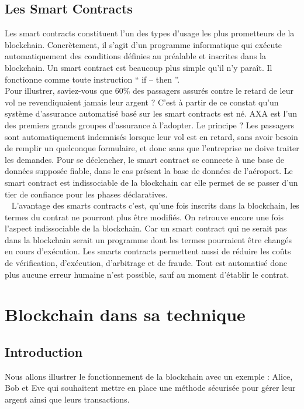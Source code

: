 \documentclass[12pt, a4paper, oneside]{book}
\begin{document}
    \section{Les Smart Contracts}
    Les smart contracts constituent l’un des types d’usage les plus prometteurs de la blockchain. Concrètement, il s’agit d’un programme informatique qui exécute automatiquement des conditions définies au préalable et inscrites dans la blockchain. Un smart contract est beaucoup plus simple qu’il n’y paraît. Il fonctionne comme toute instruction \hyphenquote{french}{ if – then }. 
    \\
    \indent
    Pour illustrer, saviez-vous que 60\% des passagers assurés contre le retard de leur vol ne revendiquaient jamais leur argent ? C’est à partir de ce constat qu’un système d’assurance automatisé basé sur les smart contracts est né. AXA est l’un des premiers grands groupes d’assurance à l’adopter. Le principe ? Les passagers sont automatiquement indemnisés lorsque leur vol est en retard, sans avoir besoin de remplir un quelconque formulaire, et donc sans que l’entreprise ne doive traiter les demandes. Pour se déclencher, le smart contract se connecte à une base de données supposée fiable, dans le cas présent la base de données de l’aéroport.
    Le smart contract est indissociable de la blockchain car elle permet de se passer d’un tier de confiance pour les phases déclaratives.
    \\
    \indent~
    L’avantage des smarts contracts c’est, qu’une fois inscrits dans la blockchain, les termes du contrat ne pourront plus être modifiés. On retrouve encore une fois l’aspect indissociable de la blockchain. Car un smart contract qui ne serait pas dans la blockchain serait un programme dont les termes pourraient être changés en cours d’exécution.
    Les smarts contracts permettent aussi de réduire les coûts de vérification, d’exécution, d’arbitrage et de fraude. Tout est automatisé donc plus aucune erreur humaine n’est possible, sauf au moment d’établir le contrat.


    \chapter{Blockchain dans sa technique}
    \section{Introduction}
    Nous allons illustrer le fonctionnement de la blockchain avec un exemple : Alice, Bob et Eve qui souhaitent mettre en place une méthode sécurisée pour gérer leur argent ainsi que leurs transactions.
\end{document}
